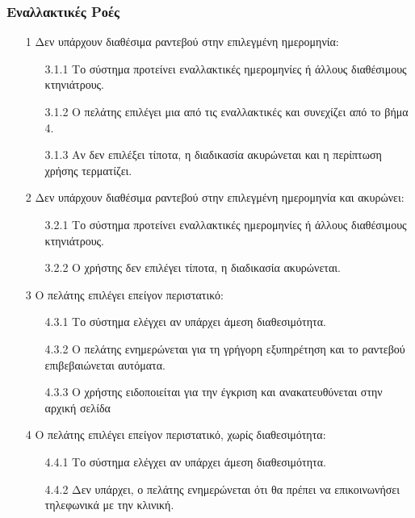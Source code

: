 \documentclass[12pt,a4paper,twoside]{book}
\begin{document}
\subsubsection{Εναλλακτικές Ροές}
\begin{enumerate}
  \item[1 ] Δεν υπάρχουν διαθέσιμα ραντεβού στην επιλεγμένη ημερομηνία: %
        \begin{enumerate}
          \item[3.1.1 ] Το σύστημα προτείνει εναλλακτικές ημερομηνίες ή άλλους διαθέσιμους κτηνιάτρους. %
          \item[3.1.2 ] Ο πελάτης επιλέγει μια από τις εναλλακτικές και συνεχίζει από το βήμα 4. %
          \item[3.1.3 ] Αν δεν επιλέξει τίποτα, η διαδικασία ακυρώνεται και η περίπτωση χρήσης τερματίζει. %
        \end{enumerate}
  \item[2 ] Δεν υπάρχουν διαθέσιμα ραντεβού στην επιλεγμένη ημερομηνία και ακυρώνει: %
        \begin{enumerate}
          \item[3.2.1 ] Το σύστημα προτείνει εναλλακτικές ημερομηνίες ή άλλους διαθέσιμους κτηνιάτρους. %
          \item[3.2.2 ] Ο χρήστης δεν επιλέγει τίποτα, η διαδικασία ακυρώνεται. %
        \end{enumerate}
  \item[3 ] Ο πελάτης επιλέγει επείγον περιστατικό:
        \begin{enumerate}
          \item[4.3.1 ] Το σύστημα ελέγχει αν υπάρχει άμεση διαθεσιμότητα. %
          \item[4.3.2 ] Ο πελάτης ενημερώνεται για τη γρήγορη εξυπηρέτηση και το ραντεβού επιβεβαιώνεται αυτόματα. %
          \item[4.3.3 ] Ο χρήστης ειδοποιείται για την έγκριση και ανακατευθύνεται στην αρχική σελίδα %
        \end{enumerate}
  \item[4 ] Ο πελάτης επιλέγει επείγον περιστατικό, χωρίς διαθεσιμότητα: %
        \begin{enumerate}
          \item[4.4.1 ] Το σύστημα ελέγχει αν υπάρχει άμεση διαθεσιμότητα. %
          \item[4.4.2 ] Δεν υπάρχει, ο πελάτης ενημερώνεται ότι θα πρέπει να επικοινωνήσει τηλεφωνικά με την κλινική.

\end{enumerate}
\end{enumerate}
\end{document}
